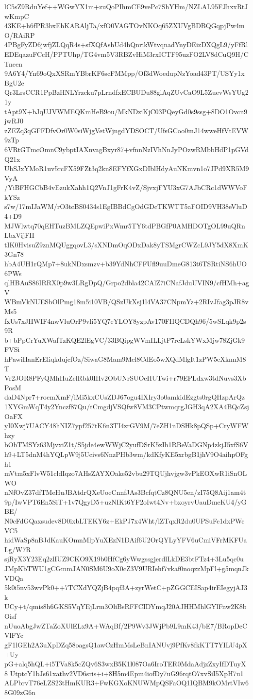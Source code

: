 lC5sZ9RduYef++WGwYX1m+zuQoPIhmCE9vePc7ShYHm/NZLAL95FJhxxRtJwKmpC
43KE+h6fPR3bxEhKARAljTa/xfO0VAGTOvNKOq65ZXUVgBDBQGqpjPw4mO/RAiRP
4PBgFyZD6jwfjZLQqR4s+sfXQfAshUd4hQnrikWtvqnadYnyDEizDXQgL9/yFfRl
EDEqazuFCcH/PPTUhp/TG4vm5V3RBZvHiM3rxICTF95uzFO2LV8dCuQ9H/CTneen
9A6Y4/Yn69oQxXSRmYBbrKF6scFMMpp/Of3dWoedupNzYoad43PT/USYy1xBgU2e
Qr3LrsCCR1PpBzHNLYrzcku7pLrndfxECBUDu88glAqZUvCaO9L5ZuevWsYUg21y
tApt9X+bJqUJVWMEQKmHeB9ou/MkNDziKjC03PQeyGd0s9ssg+8DO1Ovcn9jwRJ0
zZEZq3qGFFDfvOr0W0siWjgVetWjngdYDSOCT/UfsGCoo0mJ14wweHfVtEVW9zTp
6VRtGTmcOmnC9ybptIAXnvagBxyr87+vfnnNzIVhNnJyPOzwRMbbHdP1pGVdQ21x
UbSJxYMoR1uv5rcFX59FZt3q2kn8EFYfXGxDIblHdyAuNKmvn1o7JPd9XR5M9VyA
/YiBFHGCbB4vEzukXahh1Q2VnJ1gFrK4vZ/SjvxjFYU3xG7AJbCRc1dWWVoFkYSz
s7w/17mIJaWM/rO3tcBS0434s1EgIBBdCgOdGDcTKWTT5aFOID9VH38eVluD4+D9
MJWlwtq70qEHTuzBMLZQEpwiPxWmr5TY6tdPBGfP0AMHDOTgOL99uQRnLbxVijFH
tIK0HvisuZ9znMQUggqovL3/sXNDmOqODxDak8yTSMgrCWZcL9JY5dX8XmK3Gn78
hbA4UH1rQMp7+8ukNDxsmzv+b39YdNhCFFUfl9uuDmeG813t6TSRtiNS6hUO6PWs
qlHBAuS86IRRX0p9w3LRgDpQ/Grpo2dbla42CAlZ7iCNafJduUVIN9/cfHMh+agV
WBmVkNUESbOlPmg18m5i10VB/QSzUkXsj1l4VA37CNpmYz+2RIvJfag3pJR8vMs5
fxUs7xJHWIF4nwVluOrP9vli5YQ7eYLOY8yzpAv170FHQCDQh96/5wSLqk9p2s9R
b+bPpCrYuXWafTzKQE2lEgVC/33BQipgWVmILLjtP7rcLskYWxMjw78ZjGk9FVSi
hPawiHanErEliqkdujcfOz/SiwaG8Mam9Mel8CdEo5wXQdMlgIt1zPW5eXknnM8T
Vr2JOR8PFyQMhHuZclRbk0IHv2ObUNrSUOeHUTwi+r79EPLdxw3tdNuvs3XbPosM
daD4Npr7+rocmXmF/iMi5kxCUsZDJ67ogu4IXIry3o0amkidEzgts0rgQHzpArQz
1XYGmWqT4y2Ynczf87Qu/tCmgdjVSQfw8VM3CPtwmqrgJGH3qA2XA4BQcZsjOaFX
yI0Xwj7UACY48hNIZ7ypf257tK6n3TI4zrGV9M/7eZH1nDSHk8pQSp+CryWFWhzy
bObTMSYz63MjvxiZ1t/S5jde4ewWWjC2yufDSrK5zIh1RBeVaDGNp4zkjJ5xfS6V
h9+LT5dnM4hYQLpW9j5Ucivs6NnzPHb3wm/kdKfyKE5xrbgB1jhV9O4aihpOFgh1
mVtm5xFlvW51cldIqzo7AHsZAYXOake52vbu29TQUjhvjgw3vPkEOXwR1iSnOLWO
nNfOvZ37dfTMeHuJBAtdrQXeUoeCnnfJAs3BcfqtCz8QNU5en/zI75Q8Aij1am4t
9p/IwVPT6En5SiT+1v7QgyD5+uzNIKt6YF2oIwt4Nv+bxoyrvUauDmeKU4/yGBE/
N0cFdGQaxsudev8D0ixbLTEKY6z+EkPJ7x4Wht/lZTqxR2du0UPSuFc1dxPWcVC5
hidWaSp8nBJdKauKOmnMlpYuXEzN1DAif6U2OrQYLyYFV6uCmiVFrMKFUaLg/W7R
sjRyX3Y23Eq2zlIUZ9CKO9X19b0HfCg6yWwgssgjerdlLkDE3btFTz4+3Lu5qc0u
JMpKbTWU1gCGmmJAN0SM6U9oX0cZ3V9URIehf7vkaf0noqzzMpFl+g5mqnJkVDQa
5k0i5nv53wvPk0++7TCXdYQZjB4pqf3A+zyrWetC+pZGGCEISap4irEIegyjAJ3k
UCy+t/qmis8h6GKS5VqYEjLrm3OliBsRFFCIDYmqJ20AJHHMhlGYlFnw2K8bOisf
nUuoAbgJwZTaZoXUlELx9A+WAqBf/2P9Wv3JWjPb9L9mK43/bE7/BRopDeCVlFYc
gF1lGEh2A3uXpDZq58oagsQ1awCzHmMsLeBnIANUvj9PfKv8fkKTT7YILU4pX+Uy
pG+alq5hQL+i5TVa8k5cZQv6S3wxB5K1l087Oa6IroTER0MdaAdjzZxyIfDTuyX8
UtptcY1bJs61xathv2VD6sris+i+8H5m4Epm4iofDy7uG96rqtO7xvSiI5XpH7u1
ALPbrvT76eLZS23tHmKUR3+FwKGXoKNUWMpQSFaOQ1IQBM9kOMrtVIw68G09zG6n
